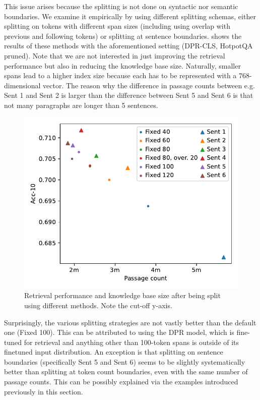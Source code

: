This issue arises because the splitting is not done on syntactic nor semantic boundaries.
We examine it empirically by using different splitting schemas, either splitting on tokens with different span sizes (including using overlap with previous and following tokens) or splitting at sentence boundaries.
 shows the results of these methods with the aforementioned setting (DPR-CLS, HotpotQA pruned).
Note that we are not interested in just improving the retrieval performance but also in reducing the knowledge base size.
Naturally, smaller spans lead to a higher index size because each has to be represented with a 768-dimensional vector. 
The reason why the difference in passage counts between e.g. Sent 1 and Sent 2 is larger than the difference between Sent 5 and Sent 6 is that not many paragraphs are longer than 5 sentences.

\begin{figure}[ht]
    \center
    \includegraphics[width=0.7\linewidth]{img/split_intro.pdf}
    
    \caption{Retrieval performance and knowledge base size after being split using different methods. Note the cut-off y-axis.}
    \label{fig:split_intro}
\end{figure}

Surprisingly, the various splitting strategies are not vastly better than the default one (Fixed 100).
This can be attributed to using the DPR model, which is fine-tuned for retrieval and anything other than 100-token spans is outside of its finetuned input distribution.
An exception is that splitting on sentence boundaries (specifically Sent 5 and Sent 6) seems to be slightly systematically better than splitting at token count boundaries, even with the same number of passage counts.
This can be possibly explained via the examples introduced previously in this section.

